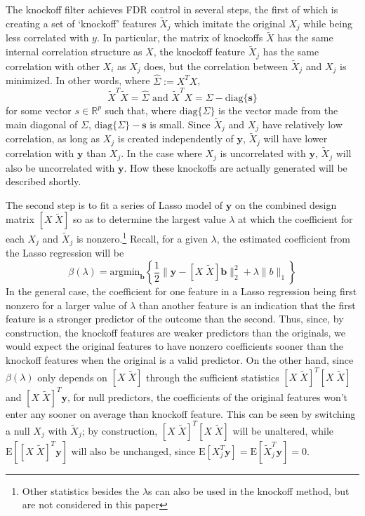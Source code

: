 \documentclass[11pt]{article}
\newcommand{\R}{\mathbb{R}}
\newcommand{\E}{\mathrm{E}}
\newcommand{\diag}[1]{\mathrm{diag}\{#1\}}
\theoremstyle{definition}
\begin{document}
    The knockoff filter achieves FDR control in several steps, the first of which is creating a set of `knockoff' features $\tilde X_j$ which imitate the original $X_j$ while being less correlated with $y$. In particular, the matrix of knockoffs $\tilde X$ has the same internal correlation structure as $X$, the knockoff feature $\tilde X_j$ has the same correlation with other $X_i$ as $X_j$ does, but the correlation between $\tilde X_j$ and $X_j$ is minimized. In other words, where $\hat \Sigma := X^TX$, 
    \[ \tilde X^T\tilde X=\hat\Sigma \textrm{ and } \tilde X^T X = \Sigma - \diag{\mathbf s}\]
    for some vector $s\in \R^p$ such that, where $\diag{\Sigma}$ is the vector made from the main diagonal of $\Sigma$, $\diag{\Sigma} - \mathbf s$ is small. Since $\tilde X_j$ and $X_j$ have relatively low correlation, as long as $X_j$ is created independently of $\mathbf y$, $\tilde X_j$ will have lower correlation with $\mathbf y$ than $X_j$. In the case where $X_j$ is uncorrelated with $\mathbf y$, $\tilde X_j$ will also be uncorrelated with $\mathbf y$. How these knockoffs are actually generated will be described shortly.\par
    The second step is to fit a series of Lasso model of $\mathbf y$ on the combined design matrix $[X \; \tilde X]$ so as to determine the largest value $\lambda$ at which the coefficient for each $X_j$ and $\tilde X_j$ is nonzero.\footnote{Other statistics besides the $\lambda$s can also be used in the knockoff method, but are not considered in this paper} Recall, for a given $\lambda$, the estimated coefficient from the Lasso regression will be 
    \[ \beta(\lambda) = \textrm{argmin}_\mathbf b \left\{\frac{1}{2}\|\mathbf y - [X\; \tilde X]\mathbf b\|^2_2 + \lambda\|b\|_1 \right\}\]
    In the general case, the coefficient for one feature in a Lasso regression being first nonzero for a larger value of $\lambda$ than another feature is an indication that the first feature is a stronger predictor of the outcome than the second. Thus, since, by construction, the knockoff features are weaker predictors than the originals, we would expect the original features to have nonzero coefficients sooner than the knockoff features when the original is a valid predictor. On the other hand, since $\beta(\lambda)$ only depends on $[X\; \tilde X]$ through the sufficient statistics $[X\; \tilde X]^T[X\; \tilde X]$ and $[X\; \tilde X]^T\mathbf y$, for null predictors, the coefficients of the original features won't enter any sooner on average than knockoff feature. This can be seen by switching a null $X_j$ with $\tilde X_j$; by construction, $[X\; \tilde X]^T[X\; \tilde X]$ will be unaltered, while $\E\left[[X\; \tilde X]^T\mathbf y\right]$ will also be unchanged, since $\E[X_j^T\mathbf y]=\E[\tilde X_j^T\mathbf y]=0$. \par
\end{document}
